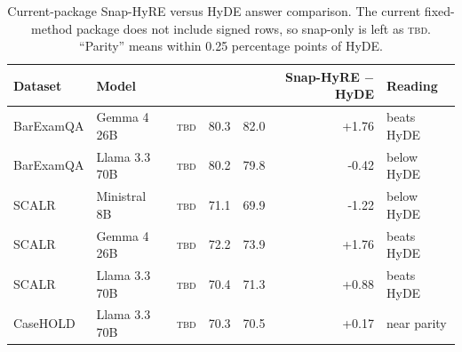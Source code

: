 \begin{table}[!htbp]
\centering
\caption{Current-package Snap-HyRE versus HyDE answer comparison. The current fixed-method package does not include signed  rows, so snap-only is left as \textsc{tbd}. ``Parity'' means within 0.25 percentage points of HyDE.}
\label{tab:current_snap_hyde_decomposition}
\scriptsize
\setlength{\tabcolsep}{4pt}
\begin{tabularx}{\textwidth}{llrrrrY}
\toprule
Dataset & Model &  &  &  & Snap-HyRE $-$ HyDE & Reading \\
\midrule
BarExamQA & Gemma 4 26B & \textsc{tbd} & 80.3 & 82.0 & +1.76 & beats HyDE \\
BarExamQA & Llama 3.3 70B & \textsc{tbd} & 80.2 & 79.8 & -0.42 & below HyDE \\
SCALR & Ministral 8B & \textsc{tbd} & 71.1 & 69.9 & -1.22 & below HyDE \\
SCALR & Gemma 4 26B & \textsc{tbd} & 72.2 & 73.9 & +1.76 & beats HyDE \\
SCALR & Llama 3.3 70B & \textsc{tbd} & 70.4 & 71.3 & +0.88 & beats HyDE \\
CaseHOLD & Llama 3.3 70B & \textsc{tbd} & 70.3 & 70.5 & +0.17 & near parity \\
\bottomrule
\end{tabularx}
\end{table}
